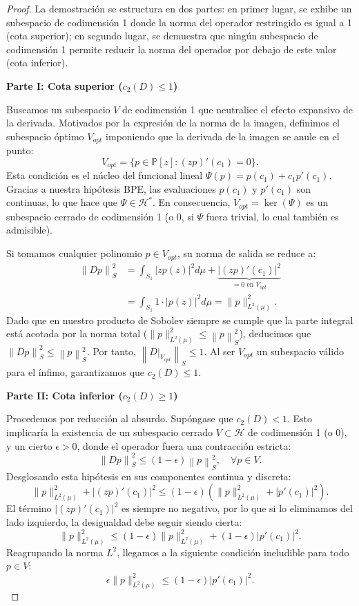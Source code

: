 \documentclass[12pt,a4paper]{article}
\theoremstyle{definition}
\theoremstyle{remark}
\newcommand{\Poly}{\mathbb{P}[z]}
\newcommand{\norm}[1]{\left\| #1 \right\|_S}
\newcommand{\abs}[1]{\left| #1 \right|}
\begin{document}
\begin{proof}
    La demostración se estructura en dos partes: en primer lugar, se exhibe un subespacio de codimensión 1 donde la norma del operador restringido es igual a 1 (cota superior); en segundo lugar, se demuestra que ningún subespacio de codimensión 1 permite reducir la norma del operador por debajo de este valor (cota inferior).

    \textbf{Parte I: Cota superior ($c_2(D) \le 1$)}

    Buscamos un subespacio $V$ de codimensión 1 que neutralice el efecto expansivo de la derivada. Motivados por la expresión de la norma de la imagen, definimos el subespacio óptimo $V_{opt}$ imponiendo que la derivada de la imagen se anule en el punto:
    $$ V_{opt} = \{ p \in \Poly : (zp)'(c_1) = 0 \}. $$
    Esta condición es el núcleo del funcional lineal $\Psi(p) = p(c_1) + c_1 p'(c_1)$. Gracias a nuestra hipótesis BPE, las evaluaciones $p(c_1)$ y $p'(c_1)$ son continuas, lo que hace que $\Psi \in \mathcal{H}^*$. En consecuencia, $V_{opt} = \ker(\Psi)$ es un subespacio cerrado de codimensión 1 (o 0, si $\Psi$ fuera trivial, lo cual también es admisible).

    Si tomamos cualquier polinomio $p \in V_{opt}$, su norma de salida se reduce a:
    \begin{align*}
        \norm{Dp}^2 & = \int_{S_1} \abs{z p(z)}^2 d\mu + \underbrace{\abs{(zp)'(c_1)}^2}_{=0 \text{ en } V_{opt}} \\
                    & = \int_{S_1} 1 \cdot \abs{p(z)}^2 d\mu = \|p\|_{L^2(\mu)}^2.
    \end{align*}
    Dado que en nuestro producto de Sobolev siempre se cumple que la parte integral está acotada por la norma total ($\|p\|_{L^2(\mu)}^2 \le \norm{p}^2$), deducimos que $\norm{Dp}^2 \le \norm{p}^2$.
    Por tanto, $\norm{D|_{V_{opt}}} \le 1$. Al ser $V_{opt}$ un subespacio válido para el ínfimo, garantizamos que $c_2(D) \le 1$.

    \textbf{Parte II: Cota inferior ($c_2(D) \ge 1$)}

    Procedemos por reducción al absurdo. Supóngase que $c_2(D) < 1$. Esto implicaría la existencia de un subespacio cerrado $V \subset \mathcal{H}$ de codimensión 1 (o 0), y un cierto $\epsilon > 0$, donde el operador fuera una contracción estricta:
    $$ \norm{Dp}^2 \le (1-\epsilon) \norm{p}^2, \quad \forall p \in V. $$
    Desglosando esta hipótesis en sus componentes continua y discreta:
    $$ \|p\|_{L^2(\mu)}^2 + \abs{(zp)'(c_1)}^2 \le (1-\epsilon) \left( \|p\|_{L^2(\mu)}^2 + \abs{p'(c_1)}^2 \right). $$
    El término $\abs{(zp)'(c_1)}^2$ es siempre no negativo, por lo que si lo eliminamos del lado izquierdo, la desigualdad debe seguir siendo cierta:
    $$ \|p\|_{L^2(\mu)}^2 \le (1-\epsilon) \|p\|_{L^2(\mu)}^2 + (1-\epsilon) \abs{p'(c_1)}^2. $$
    Reagrupando la norma $L^2$, llegamos a la siguiente condición ineludible para todo $p \in V$:
    \begin{equation} \label{eq:absurdo_n1}
        \epsilon \|p\|_{L^2(\mu)}^2 \le (1-\epsilon) \abs{p'(c_1)}^2.
    \end{equation}


\end{proof}
\end{document}
